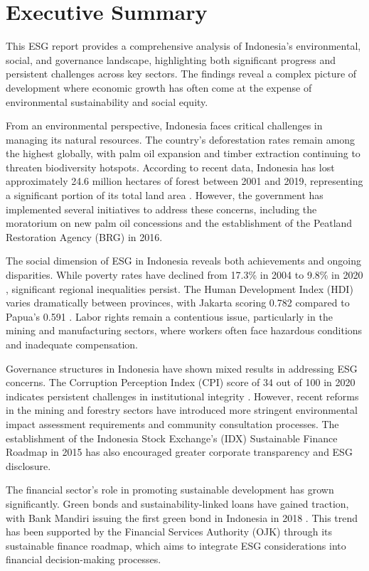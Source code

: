 \section*{Executive Summary}

This ESG report provides a comprehensive analysis of Indonesia's environmental, social, and governance landscape, highlighting both significant progress and persistent challenges across key sectors. The findings reveal a complex picture of development where economic growth has often come at the expense of environmental sustainability and social equity.

From an environmental perspective, Indonesia faces critical challenges in managing its natural resources. The country's deforestation rates remain among the highest globally, with palm oil expansion and timber extraction continuing to threaten biodiversity hotspots. According to recent data, Indonesia has lost approximately 24.6 million hectares of forest between 2001 and 2019, representing a significant portion of its total land area \cite{ref1}. However, the government has implemented several initiatives to address these concerns, including the moratorium on new palm oil concessions and the establishment of the Peatland Restoration Agency (BRG) in 2016.

The social dimension of ESG in Indonesia reveals both achievements and ongoing disparities. While poverty rates have declined from 17.3\% in 2004 to 9.8\% in 2020 \cite{ref2}, significant regional inequalities persist. The Human Development Index (HDI) varies dramatically between provinces, with Jakarta scoring 0.782 compared to Papua's 0.591 \cite{ref3}. Labor rights remain a contentious issue, particularly in the mining and manufacturing sectors, where workers often face hazardous conditions and inadequate compensation.

Governance structures in Indonesia have shown mixed results in addressing ESG concerns. The Corruption Perception Index (CPI) score of 34 out of 100 in 2020 indicates persistent challenges in institutional integrity \cite{ref4}. However, recent reforms in the mining and forestry sectors have introduced more stringent environmental impact assessment requirements and community consultation processes. The establishment of the Indonesia Stock Exchange's (IDX) Sustainable Finance Roadmap in 2015 has also encouraged greater corporate transparency and ESG disclosure.

The financial sector's role in promoting sustainable development has grown significantly. Green bonds and sustainability-linked loans have gained traction, with Bank Mandiri issuing the first green bond in Indonesia in 2018 \cite{ref5}. This trend has been supported by the Financial Services Authority (OJK) through its sustainable finance roadmap, which aims to integrate ESG considerations into financial decision-making processes.

